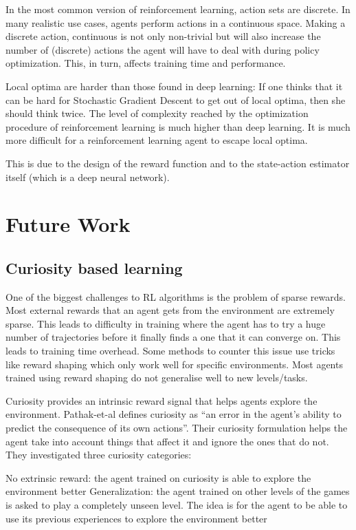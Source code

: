 \documentclass[conference]{IEEEtran}
\begin{document}
In the most common version of reinforcement learning, action sets are discrete. In many realistic use cases, agents perform actions in a continuous space. Making a discrete action, continuous is not only non-trivial but will also increase the number of (discrete) actions the agent will have to deal with during policy optimization. This, in turn, affects training time and performance.

Local optima are harder than those found in deep learning: If one thinks that it can be hard for Stochastic Gradient Descent to get out of local optima, then she should think twice. The level of complexity reached by the optimization procedure of reinforcement learning is much higher than deep learning. It is much more difficult for a reinforcement learning agent to escape local optima.

This is due to the design of the reward function and to the state-action estimator itself (which is a deep neural network).

\section{Future Work}

\subsection{\textbf{Curiosity based learning}}

One of the biggest challenges to RL algorithms is the problem of sparse rewards. Most external rewards that an agent gets from the environment are extremely sparse. This leads to difficulty in training where the agent has to try a huge number of trajectories before it finally finds a one that it can converge on. This leads to training time overhead. Some methods to counter this issue use tricks like reward shaping which only work well for specific environments. Most agents trained using reward shaping do not generalise well to new levels/tasks. 

Curiosity provides an intrinsic reward signal that helps agents explore the environment. Pathak-et-al \cite{Pathak-et-al} defines curiosity as “an error in the agent’s ability to predict the consequence of its own actions”. Their curiosity formulation helps the agent take into account things that affect it and ignore the ones that do not. They investigated three curiosity categories:

No extrinsic reward: the agent trained on curiosity is able to explore the environment better
Generalization: the agent trained on other levels of the games is asked to play a completely unseen level. The idea is for the agent to be able to use its previous experiences to explore the environment better
\end{document}
